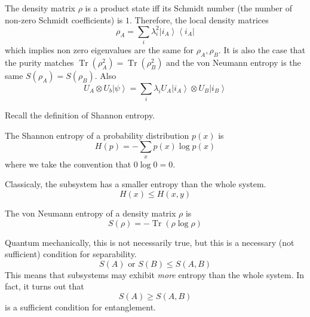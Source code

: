 \documentclass{article}
\DeclareMathOperator{\Tr}{Tr}
\newcommand{\ket}[1]{\ensuremath{\left|#1\right\rangle}}
\newcommand{\bra}[1]{\ensuremath{\left\langle#1\right|}}
\newcounter{theorem}[section]
\newcounter{definition}[section]
\begin{document}
  \begin{lemma}
    \label{thm:product-states-via-the-schmidt-number}
 
    The density matrix $\rho$ is a product state iff its Schmidt number (the number of non-zero Schmidt coefficients) is $1$. Therefore, the local density matrices 
    \begin{equation}
      \rho_A = \sum_i \lambda_i^2 \ket{i_A} \bra{i_A} 
    \end{equation}
    which implies non zero eigenvalues are the same for $\rho_A, \rho_B$. It is also the case that the purity matches $\Tr(\rho_A^2) = \Tr(\rho_B^2)$ and the von Neumann entropy is the same $S(\rho_A) = S(\rho_B)$. Also 
    \begin{equation}
      U_A \otimes U_b \ket{\psi} = \sum_i \lambda_i U_A \ket{i_A} \otimes U_B \ket{i_B} 
    \end{equation}
  \end{lemma}

  Recall the definition of Shannon entropy. 

  \begin{definition}
    \label{def:shannon-entropy}
    The Shannon entropy of a probability distribution $p(x)$ is 
    \begin{equation}
      H(p) = - \sum_x p(x) \log p(x)
    \end{equation}
    where we take the convention that $0 \log 0 = 0$.
  \end{definition}

  \begin{theorem}
    \label{thm:subsystem-entropy}
    Classicaly, the subsystem has a smaller entropy than the whole system. 
    \begin{equation}
      H(x) \leq H(x, y)
    \end{equation}
  \end{theorem}

  \begin{definition}
    \label{def:von-neumann-entropy}
    The von Neumann entropy of a density matrix $\rho$ is 
    \begin{equation}
      S(\rho) = - \Tr(\rho \log \rho)
    \end{equation}
  \end{definition}

  Quantum mechanically, this is not necessarily true, but this is a necessary (not sufficient) condition for separability. 
  \begin{equation}
    S(A) \text{ or } S(B) \leq S(A, B)
  \end{equation}
  This means that subsystems may exhibit \textit{more} entropy than the whole system. In fact, it turns out that 
  \begin{equation}
    S(A) \geq S(A, B)
  \end{equation} 
  is a sufficient condition for entanglement.
\end{document}
